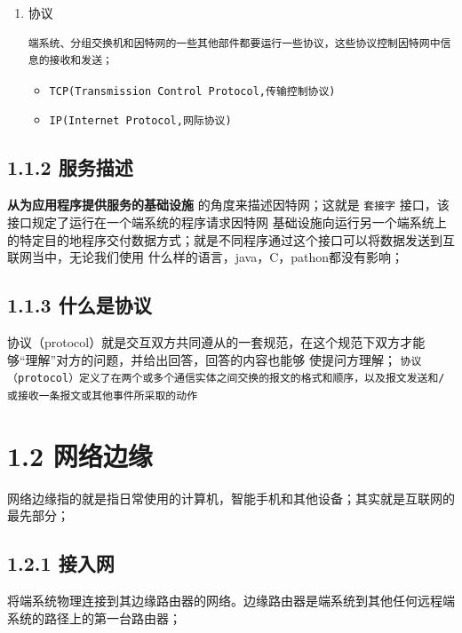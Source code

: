 \documentclass[11pt]{article}
\begin{document}
\begin{enumerate}
\item 协议
\begin{verbatim}
端系统、分组交换机和因特网的一些其他部件都要运行一些协议，这些协议控制因特网中信息的接收和发送；
\end{verbatim}

\begin{itemize}
\item \texttt{TCP(Transmission Control Protocol,传输控制协议)}
\item \texttt{IP(Internet Protocol,网际协议)}
\end{itemize}
\end{enumerate}











\subsection{1.1.2 服务描述}
\label{sec:org9be93c2}
\textbf{从为应用程序提供服务的基础设施} 的角度来描述因特网；这就是 \texttt{套接字} 接口，该接口规定了运行在一个端系统的程序请求因特网
基础设施向运行另一个端系统上的特定目的地程序交付数据方式；就是不同程序通过这个接口可以将数据发送到互联网当中，无论我们使用
什么样的语言，java，C，pathon都没有影响；

\subsection{1.1.3 什么是协议}
\label{sec:org28ab838}
协议（protocol）就是交互双方共同遵从的一套规范，在这个规范下双方才能够“理解”对方的问题，并给出回答，回答的内容也能够
使提问方理解；
\texttt{协议（protocol）定义了在两个或多个通信实体之间交换的报文的格式和顺序，以及报文发送和/或接收一条报文或其他事件所采取的动作}


\section{1.2 网络边缘}
\label{sec:orgb8ba6e5}

网络边缘指的就是指日常使用的计算机，智能手机和其他设备；其实就是互联网的最先部分；

\subsection{1.2.1 接入网}
\label{sec:orgc0a8995}
将端系统物理连接到其边缘路由器的网络。边缘路由器是端系统到其他任何远程端系统的路径上的第一台路由器；
\end{document}

